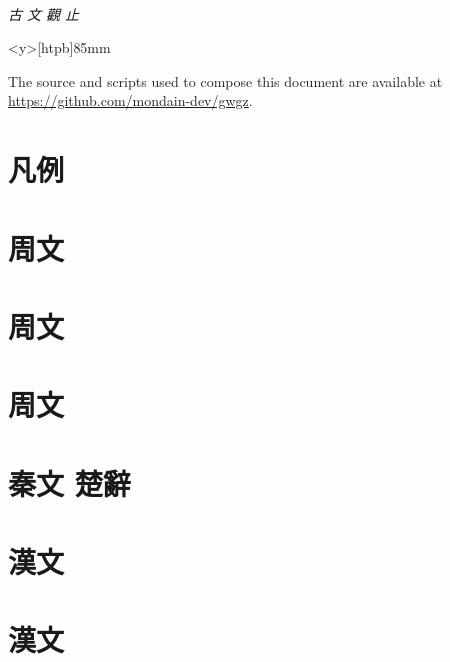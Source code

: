 \documentclass[openany,a5paper]{utbook}
\begin{document}
\thispagestyle{empty}
~\vfill{\Huge\it 古 文 觀 止\par}\vfill
\newpage\thispagestyle{empty}
\begin{minipage}<y>[htpb]{85mm}
\vspace{12cm}
{\centering \footnotesize The source and scripts used to compose this document are available at \url{https://github.com/mondain-dev/gwgz}.\par}
\end{minipage}

\frontmatter
\renewcommand\thepage{\rensuji{\roman{page}}\relax}
\begin{multicols}{2}
\tableofcontents
\end{multicols}

\chapter{凡例}

\mainmatter
\renewcommand\thepage{\zhdigits{\arabic{page}}\relax}
\chapter[{\small 周文}]{周文}


\chapter[{\small 周文}]{周文}


\chapter[{\small 周文}]{周文}


\chapter[{\small 秦文 楚辭}]{秦文 楚辭}


\chapter[{\small 漢文}]{漢文}


\chapter[{\small 漢文}]{漢文}

\end{document}
